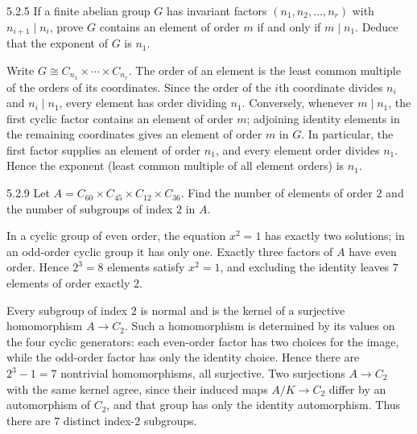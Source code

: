 \documentclass[11pt,oneside]{article}
\begin{document}
\begin{exercise}{5.2.5}
If a finite abelian group $G$ has invariant factors $(n_1,n_2,\ldots,n_r)$ with $n_{i+1}\mid n_i$, prove $G$ contains an element of order $m$ if and only if $m\mid n_1$. Deduce that the exponent of $G$ is $n_1$.
\end{exercise}

\begin{solution}
Write $G\cong C_{n_1}\times\cdots\times C_{n_r}$. The order of an element is the least common multiple of the orders of its coordinates. Since the order of the $i$th coordinate divides $n_i$ and $n_i\mid n_1$, every element has order dividing $n_1$. Conversely, whenever $m\mid n_1$, the first cyclic factor contains an element of order $m$; adjoining identity elements in the remaining coordinates gives an element of order $m$ in $G$. In particular, the first factor supplies an element of order $n_1$, and every element order divides $n_1$. Hence the exponent (least common multiple of all element orders) is $n_1$.
\end{solution}

\begin{exercise}{5.2.9}
Let $A=C_{60}\times C_{45}\times C_{12}\times C_{36}$. Find the number of elements of order $2$ and the number of subgroups of index $2$ in $A$.
\end{exercise}

\begin{solution}
In a cyclic group of even order, the equation $x^2=1$ has exactly two solutions; in an odd-order cyclic group it has only one. Exactly three factors of $A$ have even order. Hence $2^3=8$ elements satisfy $x^2=1$, and excluding the identity leaves $\boxed{7}$ elements of order exactly $2$.

Every subgroup of index $2$ is normal and is the kernel of a surjective homomorphism $A\to C_2$. Such a homomorphism is determined by its values on the four cyclic generators: each even-order factor has two choices for the image, while the odd-order factor has only the identity choice. Hence there are $2^3-1=7$ nontrivial homomorphisms, all surjective. Two surjections $A\to C_2$ with the same kernel agree, since their induced maps $A/K\to C_2$ differ by an automorphism of $C_2$, and that group has only the identity automorphism. Thus there are $\boxed{7}$ distinct index-$2$ subgroups.
\end{solution}
\end{document}
